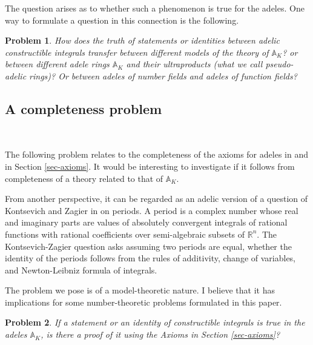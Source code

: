 \documentclass[12pt]{amsart}
\def\A{\mathbb{A}}
\def\R{\mathbb{R}}
\def\R{\mathbb{R}}
\numberwithin{equation}{section}
\newtheorem{prob}{Problem}[section]
\begin{document}
The question arises as to whether such a phenomenon is true for the adeles. One way to formulate a question in this connection is the following.

\begin{prob} How does the truth of statements or identities between adelic constructible integrals transfer between different models of the theory of $\A_K$? or between different adele rings $\A_K$ and their ultraproducts 
(what we call pseudo-adelic rings)? Or between adeles of number fields and adeles of function fields?\end{prob}

\medskip

\subsection{\bf A completeness problem}

\

\medskip

The following problem relates to the completeness of the axioms for adeles in \cite{DM-axioms} and in Section \ref{sec-axioms}. It would be interesting to investigate if it follows from completeness of a theory related to that of $\A_K$. 

From another perspective, it can be regarded as an adelic version of a question of Kontsevich and Zagier in \cite{KZ} on periods. A period is a complex number whose real and imaginary parts are values of absolutely convergent integrals of 
rational functions with rational coefficients over semi-algebraic subsets of $\R^n$. The Kontsevich-Zagier question asks assuming two periods are equal, whether the identity of the periods follows from the rules of additivity, change of variables, and 
Newton-Leibniz formula of integrals.
  
The problem we pose is of a model-theoretic nature. I believe that it has implications for some number-theoretic problems formulated in this paper.

\begin{prob} If a statement or an identity of constructible integrals is true in the adeles $\A_K$, is there a proof of it using the Axioms in Section \ref{sec-axioms}?
\end{prob}




\end{document}
